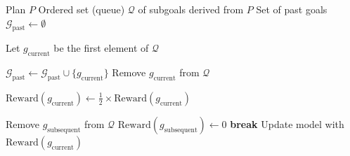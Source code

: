 \begin{algorithm}
\caption{Training Routine with Crafted Reward Function}
\label{alg:reward_func}
\begin{algorithmic}[1]
\STATE Plan $P$
\STATE Ordered set (queue) $\mathcal{Q}$ of subgoals derived from $P$
\STATE Set of past goals $\mathcal{G}_{\text{past}} \gets \emptyset$

    \STATE Let $g_{\text{current}}$ be the first element of $\mathcal{Q}$
    
        \STATE $\mathcal{G}_{\text{past}} \gets \mathcal{G}_{\text{past}} \cup \{ g_{\text{current}} \}$
        \STATE Remove $g_{\text{current}}$ from $\mathcal{Q}$
        
            \STATE $\text{Reward}(g_{\text{current}}) \gets \frac{1}{2} \times \text{Reward}(g_{\text{current}})$
        \ENDIF
        
                \STATE Remove $g_{\text{subsequent}}$ from $\mathcal{Q}$
                \STATE $\text{Reward}(g_{\text{subsequent}}) \gets 0$
            \ELSE
                \STATE \textbf{break}
            \ENDIF
        \ENDFOR
    \ELSE
        \STATE Update model with $\text{Reward}(g_{\text{current}})$
    \ENDIF
\ENDWHILE
\end{algorithmic}
\end{algorithm}
